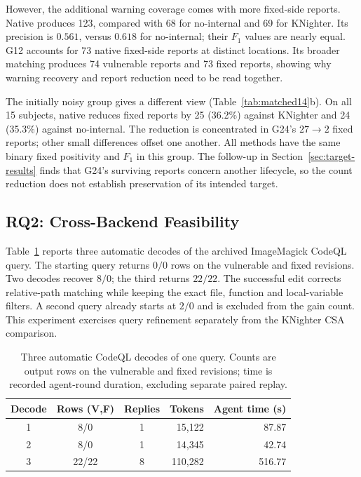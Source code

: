 However, the additional warning coverage comes with more fixed-side reports.
Native produces 123, compared with 68 for no-internal and 69 for KNighter.
Its precision is $0.561$, versus $0.618$ for no-internal; their $F_1$ values are nearly equal.
G12 accounts for 73 native fixed-side reports at distinct locations.
Its broader matching produces 74 vulnerable reports and 73 fixed reports, showing why warning recovery and report reduction need to be read together.

The initially noisy group gives a different view (Table~\ref{tab:matched14}b).
On all 15 subjects, native reduces fixed reports by 25 (36.2\%) against KNighter and 24 (35.3\%) against no-internal.
The reduction is concentrated in G24's $27\rightarrow2$ fixed reports; other small differences offset one another.
All methods have the same binary fixed positivity and $F_1$ in this group.
The follow-up in Section~\ref{sec:target-results} finds that G24's surviving reports concern another lifecycle, so the count reduction does not establish preservation of its intended target.

\subsection{RQ2: Cross-Backend Feasibility}

Table~\ref{tab:codeql-decoding} reports three automatic decodes of the archived ImageMagick CodeQL query.
The starting query returns $0/0$ rows on the vulnerable and fixed revisions.
Two decodes recover $8/0$; the third returns $22/22$.
The successful edit corrects relative-path matching while keeping the exact file, function and local-variable filters.
A second query already starts at $2/0$ and is excluded from the gain count.
This experiment exercises query refinement separately from the KNighter CSA comparison.

\begin{table}[!htbp]
\centering
\caption{Three automatic CodeQL decodes of one query. Counts are output rows on the vulnerable and fixed revisions; time is recorded agent-round duration, excluding separate paired replay.}
\label{tab:codeql-decoding}
\begingroup\FTTableSetup
\begin{tabular}{c|c|crr}
\hline\hline
Decode & Rows (V,F) & Replies & Tokens & Agent time (s)\\\hline
1 &8/0&1&15,122&87.87\\
2 &8/0&1&14,345&42.74\\
3 &22/22&8&110,282&516.77\\
\hline\hline
\end{tabular}\endgroup
\end{table}


